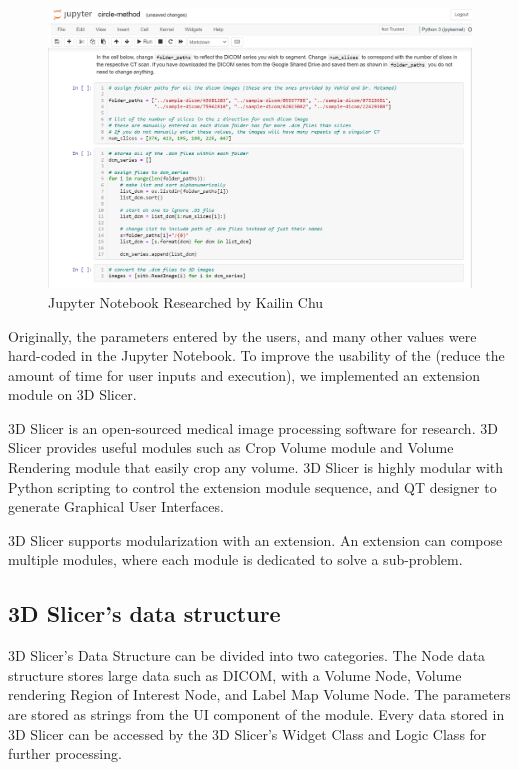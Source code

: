 \begin{figure}[H]
    \centering
    \includegraphics[width=\textwidth]{figures/AGR/jupyter_research.png}
    \caption[Jupyter Notebook Research]{Jupyter Notebook Researched by Kailin Chu}
    \label{fig_jnr}
\end{figure}

Originally, the parameters entered by the users, and many other values were hard-coded in the Jupyter Notebook. To improve the usability of the \progname{} (reduce the amount of time for user inputs and execution), we implemented an extension module on 3D Slicer. 

3D Slicer is an open-sourced medical image processing software for research. 3D Slicer provides useful modules such as Crop Volume module and Volume Rendering module that easily crop any volume. 3D Slicer is highly modular with Python scripting to control the extension module sequence, and QT designer to generate Graphical User Interfaces.

3D Slicer supports modularization with an extension. An extension can compose multiple modules, where each module is dedicated to solve a sub-problem.

\subsection{3D Slicer's data structure}

3D Slicer's Data Structure can be divided into two categories. The Node data structure stores large data such as DICOM, with a Volume Node, Volume rendering Region of Interest Node, and Label Map Volume Node. The parameters are stored as strings from the UI component of the module. Every data stored in 3D Slicer can be accessed by the 3D Slicer's Widget Class and Logic Class for further processing. 

